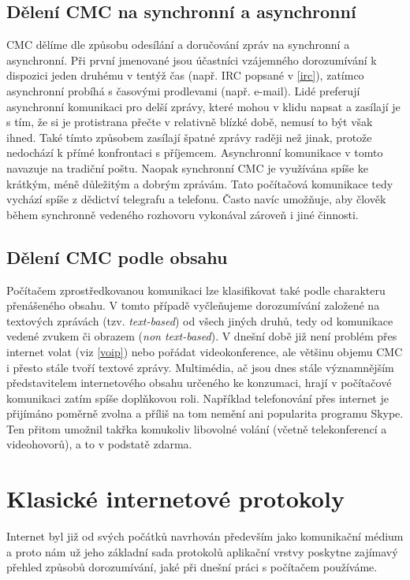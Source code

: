 \documentclass[12pt,oneside,final]{fithesis2}
\begin{document}
\subsection{Dělení CMC na synchronní a asynchronní}
CMC dělíme dle způsobu odesílání a doručování zpráv na synchronní a asynchronní. Při první jmenované jsou účastníci vzájemného dorozumívání k dispozici jeden druhému v tentýž čas (např. IRC popsané v \ref{irc}), zatímco asynchronní probíhá s časovými prodlevami (např. e-mail). Lidé preferují asynchronní komunikaci pro delší zprávy, které mohou v klidu napsat a zasílají je s tím, že si je protistrana přečte v relativně blízké době, nemusí to být však ihned. Také tímto způsobem zasílají špatné zprávy raději než jinak, protože nedochází k přímé konfrontaci s příjemcem. Asynchronní komunikace v tomto navazuje na tradiční poštu. Naopak synchronní CMC je využívána spíše ke krátkým, méně důležitým a dobrým zprávám. Tato počítačová komunikace tedy vychází spíše z dědictví telegrafu a telefonu. Často navíc umožňuje, aby člověk během synchronně vedeného rozhovoru vykonával zároveň i jiné činnosti.

\subsection{Dělení CMC podle obsahu}
Počítačem zprostředkovanou komunikaci lze klasifikovat také podle charakteru přenášeného obsahu. V tomto případě vyčleňujeme dorozumívání založené na textových zprávách (tzv. {\it text-based}) od všech jiných druhů, tedy od komunikace vedené zvukem či obrazem ({\it non text-based}). V dnešní době již není problém přes internet volat (viz \ref{voip}) nebo pořádat videokonference, ale většinu objemu CMC i přesto stále tvoří textové zprávy. Multimédia, ač jsou dnes stále významnějším představitelem internetového obsahu určeného ke konzumaci, hrají v počítačové komunikaci zatím spíše doplňkovou roli. Například telefonování přes internet je přijímáno poměrně zvolna \cite{latif2007adoption} a příliš na tom nemění ani popularita programu Skype. Ten přitom umožnil takřka komukoliv libovolné volání (včetně telekonferencí a videohovorů), a to v podstatě zdarma.

\section{Klasické internetové protokoly}\label{protocols}
Internet byl již od svých počátků navrhován především jako komunikační médium a proto nám už jeho základní sada protokolů aplikační vrstvy poskytne zajímavý přehled způsobů dorozumívání, jaké při dnešní práci s počítačem používáme.
\end{document}
